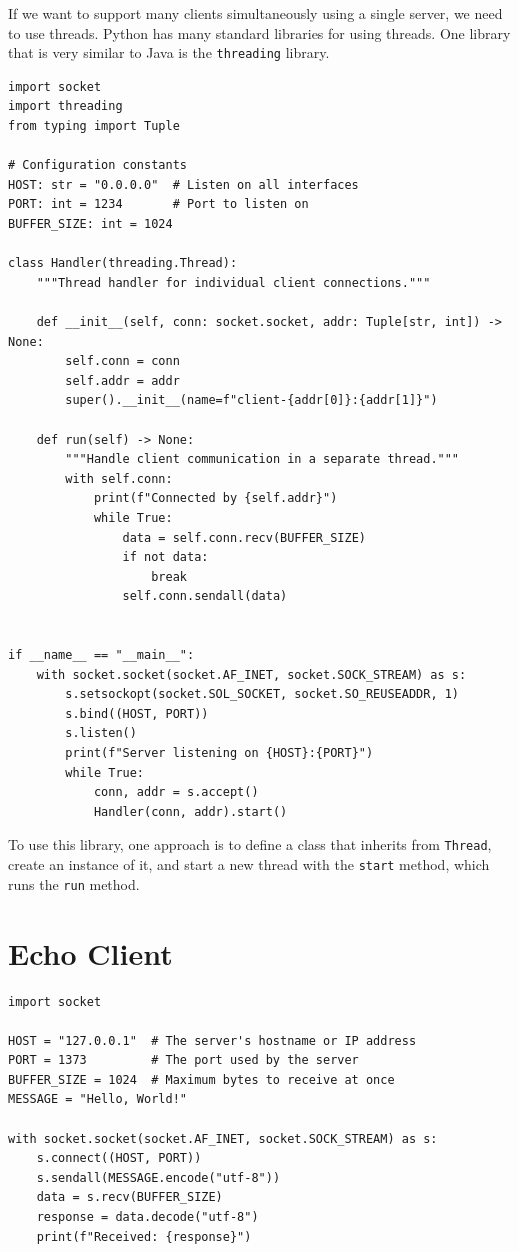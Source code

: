 \documentclass[]{article}
\begin{document}
  If we want to support many clients simultaneously using a single server, we need to use threads.
  Python has many standard libraries for using threads. One library that is very similar to Java is the \texttt{threading} library.

  \begin{verbatim}
import socket
import threading
from typing import Tuple

# Configuration constants
HOST: str = "0.0.0.0"  # Listen on all interfaces
PORT: int = 1234       # Port to listen on
BUFFER_SIZE: int = 1024

class Handler(threading.Thread):
    """Thread handler for individual client connections."""

    def __init__(self, conn: socket.socket, addr: Tuple[str, int]) -> None:
        self.conn = conn
        self.addr = addr
        super().__init__(name=f"client-{addr[0]}:{addr[1]}")

    def run(self) -> None:
        """Handle client communication in a separate thread."""
        with self.conn:
            print(f"Connected by {self.addr}")
            while True:
                data = self.conn.recv(BUFFER_SIZE)
                if not data:
                    break
                self.conn.sendall(data)


if __name__ == "__main__":
    with socket.socket(socket.AF_INET, socket.SOCK_STREAM) as s:
        s.setsockopt(socket.SOL_SOCKET, socket.SO_REUSEADDR, 1)
        s.bind((HOST, PORT))
        s.listen()
        print(f"Server listening on {HOST}:{PORT}")
        while True:
            conn, addr = s.accept()
            Handler(conn, addr).start()
  \end{verbatim}

  To use this library, one approach is to define a class that inherits from \texttt{Thread}, create an instance of it, and start a new thread with the \texttt{start} method, which runs the \texttt{run} method.

  \section{Echo Client}

  \begin{verbatim}
import socket

HOST = "127.0.0.1"  # The server's hostname or IP address
PORT = 1373         # The port used by the server
BUFFER_SIZE = 1024  # Maximum bytes to receive at once
MESSAGE = "Hello, World!"

with socket.socket(socket.AF_INET, socket.SOCK_STREAM) as s:
    s.connect((HOST, PORT))
    s.sendall(MESSAGE.encode("utf-8"))
    data = s.recv(BUFFER_SIZE)
    response = data.decode("utf-8")
    print(f"Received: {response}")
  \end{verbatim}
\end{document}
